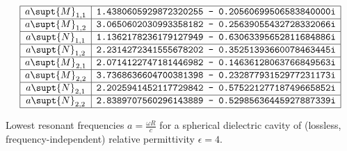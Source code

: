 \documentclass[letterpaper]{article}
\begin{document}
\begin{table}
\begin{center}
\renewcommand{\arraystretch}{2.0}
$$\begin{array}{|c|c|}\hline
 a\supt{M}_{1,1}
 & \texttt{1.4380605929872320255 - 0.20560699506583840000i}
\\\hline
 a\supt{M}_{1,2}
 & \texttt{3.0650602030993358182 - 0.25639055432728332066i}
\\\hline
 a\supt{N}_{1,1}
 & \texttt{1.1362178236179127949 - 0.63063395652811684886i}
\\\hline
 a\supt{N}_{1,2}
 & \texttt{2.2314272341555678202 - 0.35251393660078463445i}
 \\\hline
 a\supt{M}_{2,1}
 & \texttt{2.0714122747181446982 - 0.14636128063766849563i}
\\\hline
 a\supt{M}_{2,2}
 & \texttt{3.7368636604700381398 - 0.23287793152977231173i}
\\\hline
 a\supt{N}_{2,1}
 & \texttt{2.2025941452117729842 - 0.57522127718749665852i}
\\\hline
 a\supt{N}_{2,2}
 & \texttt{2.8389707560296143889 - 0.52985636445927887339i}
\\\hline
\end{array}$$
\renewcommand{\arraystretch}{1.0}
\caption{Lowest resonant frequencies $a=\frac{\omega R}{c}$ for
         a spherical dielectric cavity of (lossless,
         frequency-independent) relative permittivity $\epsilon=4.$}
\label{ResonantFrequencyTable}
\end{center}
\end{table}

 
\newpage
\end{document}
